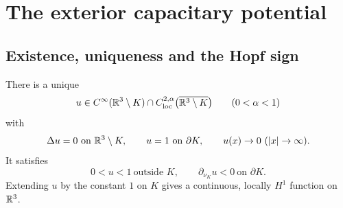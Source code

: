 \chapter{The exterior capacitary potential}\label{ch:potential}

\section{Existence, uniqueness and the Hopf sign}

\begin{theorem}\label{thm:capacitary-potential}
There is a unique
\[
  u\in C^\infty(\mathbb R^3\setminus K)
    \cap C^{2,\alpha}_{\mathrm{loc}}\bigl(\overline{\mathbb R^3\setminus K}\bigr)
  \qquad(0<\alpha<1)
\]
with
\begin{equation}\label{eq:capacitary-problem}
  \Delta u=0\ \text{on }\mathbb R^3\setminus K,
  \qquad
  u=1\ \text{on }\partial K,
  \qquad
  u(x)\to0\ (|x|\to\infty).
\end{equation}
It satisfies
\begin{equation}\label{eq:capacitary-signs}
  0<u<1\ \text{outside }K,
  \qquad
  \partial_{\nu_K}u<0\ \text{on }\partial K .
\end{equation}
Extending $u$ by the constant $1$ on $K$ gives a continuous, locally $H^1$
function on $\mathbb R^3$.
\end{theorem}

